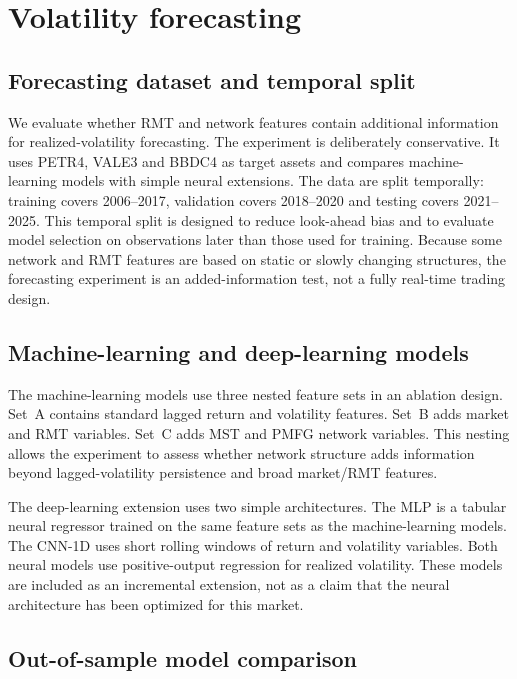 \section{Volatility forecasting}
\label{sec:forecasting}

\subsection{Forecasting dataset and temporal split}

We evaluate whether RMT and network features contain additional information for realized-volatility forecasting. The experiment is deliberately conservative. It uses PETR4, VALE3 and BBDC4 as target assets and compares machine-learning models with simple neural extensions. The data are split temporally: training covers 2006--2017, validation covers 2018--2020 and testing covers 2021--2025. This temporal split is designed to reduce look-ahead bias and to evaluate model selection on observations later than those used for training. Because some network and RMT features are based on static or slowly changing structures, the forecasting experiment is an added-information test, not a fully real-time trading design.

\subsection{Machine-learning and deep-learning models}

The machine-learning models use three nested feature sets in an ablation design. Set~A contains standard lagged return and volatility features. Set~B adds market and RMT variables. Set~C adds MST and PMFG network variables. This nesting allows the experiment to assess whether network structure adds information beyond lagged-volatility persistence and broad market/RMT features.

The deep-learning extension uses two simple architectures. The MLP is a tabular neural regressor trained on the same feature sets as the machine-learning models. The CNN-1D uses short rolling windows of return and volatility variables. Both neural models use positive-output regression for realized volatility. These models are included as an incremental extension, not as a claim that the neural architecture has been optimized for this market.

\subsection{Out-of-sample model comparison}


